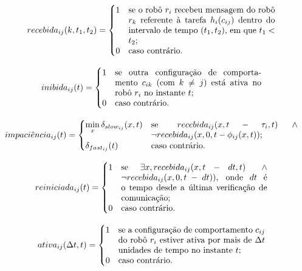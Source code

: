             \begin{equation}
                recebida_{ij}(k, t_1, t_2) =
                \begin{cases}
                    1 & \parbox[t]{.5\textwidth}{se o robô $r_i$ recebeu mensagem do robô $r_k$ referente à tarefa $h_i(c_{ij})$ dentro do intervalo de tempo $(t_1, t_2)$, em que $t_1 < t_2$;} \\
                    0 & \text{caso contrário.}
                \end{cases}
            \end{equation}
            
            \begin{equation}
                inibida_{ij}(t) =
                \begin{cases}
                    1 & \parbox[t]{.5\textwidth}{se outra configuração de comportamento $c_{ik}$ (com $k \neq j$) está ativa no robô $r_i$ no instante $t$;} \\
                    0 & \text{caso contrário.}
                \end{cases}
            \end{equation}
            
            \begin{equation}
                impaci\hat{e}ncia_{ij}(t) =
                \begin{cases}
                    \min\limits_{x}\delta_{slow_{ij}}(x, t) & \parbox[t]{.5\textwidth}{se $ recebida_{ij}(x, t - \tau_i, t) \, \land \, \lnot recebida_{ij}(x, 0, t - \phi_{ij}(x, t))$;} \\
                    \delta_{fast_{ij}}(t) & \text{caso contrário.}
                \end{cases}
            \end{equation}
            
            \begin{equation}
                reiniciada_{ij}(t) =
                \begin{cases}
                    1 & \parbox[t]{.5\textwidth}{se $\exists x, recebida_{ij}(x, t - dt, t) \: \land \: \lnot recebida_{ij}(x, 0, t - dt))$, onde $dt$ é o tempo desde a última verificação de comunicação;} \\
                    0 & \text{caso contrário.}
                \end{cases}
            \end{equation}
            
            \begin{equation}
                ativa_{ij}(\Delta t, t) =
                \begin{cases}
                    1 & \parbox[t]{.5\textwidth}{se a configuração de comportamento $c_{ij}$ do robô $r_i$ estiver ativa por mais de $\Delta t$ unidades de tempo no instante $t$;} \\
                    0 & \text{caso contrário.}
                \end{cases}
            \end{equation}
            
